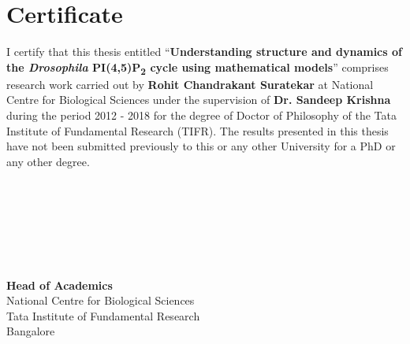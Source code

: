 \chapter[Certificate]{\centering Certificate}
I certify that this thesis entitled “\textbf{Understanding structure and dynamics of the \textit{Drosophila} PI(4,5)P\textsubscript{2} cycle using mathematical models}” comprises research work carried out by \textbf{Rohit Chandrakant Suratekar} at National Centre for Biological Sciences under the supervision of \textbf{Dr. Sandeep Krishna} during the period 2012 - 2018 for the degree of Doctor of Philosophy of the Tata Institute of Fundamental Research (TIFR). The results presented in this thesis have not been submitted previously to this or any other University for a PhD or any other degree.
\\\\\\\\\\\\\\\\
\null\hfill \textbf{Head of Academics}\\
\null\hfill National Centre for Biological Sciences\\
\null\hfill Tata Institute of Fundamental Research\\
\null\hfill Bangalore\\